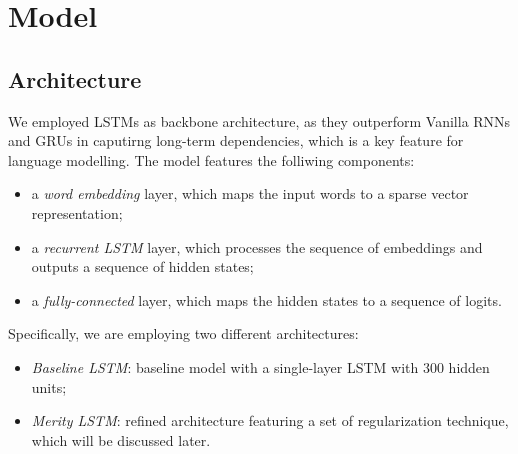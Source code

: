 \section{Model}
\label{sec:4_model}
 
\subsection{Architecture}
\label{sec:4_arch}
We employed LSTMs as backbone architecture, as they outperform Vanilla RNNs and GRUs in caputirng long-term dependencies, which is a key feature for language modelling. The model features the folliwing components:
\begin{itemize}
    \item a \emph{word embedding} layer, which maps the input words to a sparse vector representation;
    \item a \emph{recurrent LSTM} layer, which processes the sequence of embeddings and outputs a sequence of hidden states;
    \item a \emph{fully-connected} layer, which maps the hidden states to a sequence of logits.
\end{itemize}
Specifically, we are employing two different architectures:
\begin{itemize}
    \item \emph{Baseline LSTM}: baseline model with a single-layer LSTM with \(300\) hidden units;
    \item \emph{Merity LSTM}: refined architecture featuring a set of regularization technique, which will be discussed later.
\end{itemize}

